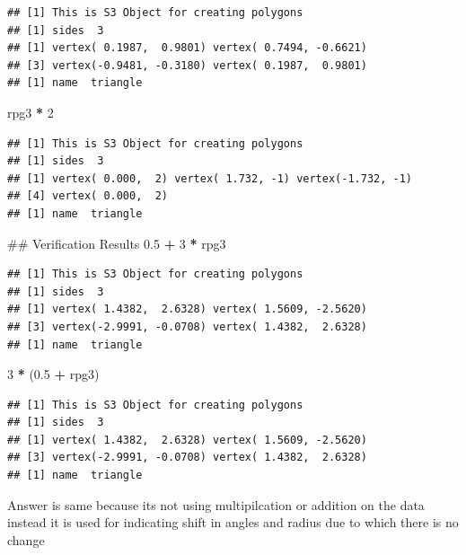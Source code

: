 \documentclass[]{article}
\newenvironment{Shaded}{\begin{snugshade}}{\end{snugshade}}
\newcommand{\DecValTok}[1]{\textcolor[rgb]{0.00,0.00,0.81}{#1}}
\newcommand{\FloatTok}[1]{\textcolor[rgb]{0.00,0.00,0.81}{#1}}
\newcommand{\StringTok}[1]{\textcolor[rgb]{0.31,0.60,0.02}{#1}}
\newcommand{\OperatorTok}[1]{\textcolor[rgb]{0.81,0.36,0.00}{\textbf{#1}}}
\newcommand{\NormalTok}[1]{#1}
\begin{document}
\begin{verbatim}
## [1] This is S3 Object for creating polygons
## [1] sides  3
## [1] vertex( 0.1987,  0.9801) vertex( 0.7494, -0.6621)
## [3] vertex(-0.9481, -0.3180) vertex( 0.1987,  0.9801)
## [1] name  triangle
\end{verbatim}

\begin{Shaded}
\begin{Highlighting}[]
\NormalTok{rpg3 }\OperatorTok{*}\StringTok{ }\DecValTok{2}
\end{Highlighting}
\end{Shaded}

\begin{verbatim}
## [1] This is S3 Object for creating polygons
## [1] sides  3
## [1] vertex( 0.000,  2) vertex( 1.732, -1) vertex(-1.732, -1)
## [4] vertex( 0.000,  2)
## [1] name  triangle
\end{verbatim}

\begin{Shaded}
\begin{Highlighting}[]
\NormalTok{## Verification Results}
\FloatTok{0.5} \OperatorTok{+}\StringTok{ }\DecValTok{3} \OperatorTok{*}\StringTok{ }\NormalTok{rpg3}
\end{Highlighting}
\end{Shaded}

\begin{verbatim}
## [1] This is S3 Object for creating polygons
## [1] sides  3
## [1] vertex( 1.4382,  2.6328) vertex( 1.5609, -2.5620)
## [3] vertex(-2.9991, -0.0708) vertex( 1.4382,  2.6328)
## [1] name  triangle
\end{verbatim}

\begin{Shaded}
\begin{Highlighting}[]
\DecValTok{3} \OperatorTok{*}\StringTok{ }\NormalTok{(}\FloatTok{0.5} \OperatorTok{+}\StringTok{ }\NormalTok{rpg3)}
\end{Highlighting}
\end{Shaded}

\begin{verbatim}
## [1] This is S3 Object for creating polygons
## [1] sides  3
## [1] vertex( 1.4382,  2.6328) vertex( 1.5609, -2.5620)
## [3] vertex(-2.9991, -0.0708) vertex( 1.4382,  2.6328)
## [1] name  triangle
\end{verbatim}

Answer is same because its not using multipilcation or addition on the
data instead it is used for indicating shift in angles and radius due to
which there is no change
\end{document}
